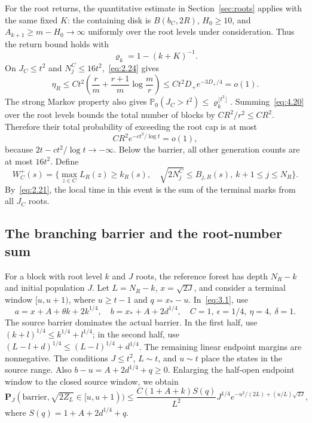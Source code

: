 \documentclass[11pt,letterpaper,reqno]{amsart}
\numberwithin{equation}{section}
\theoremstyle{remark}
\begin{document}
For the root returns, the quantitative estimate in Section~\ref{sec:roots} applies with the same fixed $K$: the containing disk is $B(b_C,2R)$, $H_0\ge10$, and $A_{k+1}\ge m-H_0\to\infty$ uniformly over the root levels under consideration. Thus the return bound holds with
\begin{equation}\label{eq:4.21}
\varrho_k=1-(k+K)^{-1}.
\end{equation}
On $J_C\le t^2$ and $N_j^C\le16t^2$,~\eqref{eq:2.24} gives
\begin{equation}\label{eq:4.22}
\eta_R\le Ct^2\left(\frac rm+\frac{r+1}m\log\frac mr\right)
\le Ct^2D_+e^{-3D_+/4}=o(1).
\end{equation}
The strong Markov property also gives
$\mathbb P_0(J_C>t^2)\le\varrho_k^{\lfloor t^2\rfloor}$.
Summing~\eqref{eq:4.20} over the root levels bounds the total number of blocks by $CR^2/r^2\le CR^2$. Therefore their total probability of exceeding the root cap is at most
\begin{equation}\label{eq:4.23}
CR^2e^{-ct^2/\log t}=o(1),
\end{equation}
because $2t-ct^2/\log t\to-\infty$.
Below the barrier, all other generation counts are at most $16t^2$. Define
\begin{equation}\label{eq:4.24}
W_C^+(s)=\{\max_{z\in C}L_R(z)\ge k_R(s),\quad
\sqrt{2N_j^C}\le B_{j,R}(s),\ k+1\le j\le N_R\}.
\end{equation}
By~\eqref{eq:2.21}, the local time in this event is the sum of the terminal marks from all $J_C$ roots.

\subsection{The branching barrier and the root-number sum}\label{sec:uppergw}
For a block with root level $k$ and $J$ roots, the reference forest has depth $N_R-k$ and initial population $J$. Let $L=N_R-k$, $x=\sqrt{2J}$, and consider a terminal window $[u,u+1)$, where $u\ge t-1$ and $q=x_*-u$. In~\eqref{eq:3.1}, use
\begin{equation}\label{eq:4.25}
a=x+A+\theta k+2k^{1/4},\quad
b=x_*+A+2d^{1/4},\quad C=1,\ \epsilon=1/4,\ \eta=4,\ \delta=1.
\end{equation}
The source barrier dominates the actual barrier. In the first half, use
$(k+l)^{1/4}\le k^{1/4}+l^{1/4}$; in the second half, use
$(L-l+d)^{1/4}\le(L-l)^{1/4}+d^{1/4}$. The remaining linear endpoint margins are nonnegative. The conditions $J\le t^2$, $L\sim t$, and $u\sim t$ place the states in the source range. Also $b-u=A+2d^{1/4}+q\ge0$. Enlarging the half-open endpoint window to the closed source window, we obtain
\begin{equation}\label{eq:4.26}
\mathbf P_J(\text{barrier},\sqrt{2Z_L}\in[u,u+1))
\le\frac{C(1+A+k)S(q)}{L^2}J^{1/4}
 e^{-u^2/(2L)+(u/L)\sqrt{2J}},
\end{equation}
where $S(q)=1+A+2d^{1/4}+q$.
\end{document}
